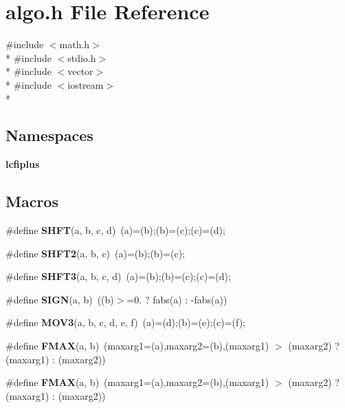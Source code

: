 \section{algo.\-h File Reference}
\label{algo_8h}
{\ttfamily \#include $<$math.\-h$>$}\\*
{\ttfamily \#include $<$stdio.\-h$>$}\\*
{\ttfamily \#include $<$vector$>$}\\*
{\ttfamily \#include $<$iostream$>$}\\*
\subsection*{Namespaces}
\begin{DoxyCompactItemize}
\item 
{\bf lcfiplus}
\end{DoxyCompactItemize}
\subsection*{Macros}
\begin{DoxyCompactItemize}
\item 
\#define {\bf S\-H\-F\-T}(a, b, c, d)~(a)=(b);(b)=(c);(c)=(d);
\item 
\#define {\bf S\-H\-F\-T2}(a, b, c)~(a)=(b);(b)=(c);
\item 
\#define {\bf S\-H\-F\-T3}(a, b, c, d)~(a)=(b);(b)=(c);(c)=(d);
\item 
\#define {\bf S\-I\-G\-N}(a, b)~((b)$>$=0. ? fabs(a) \-: -\/fabs(a))
\item 
\#define {\bf M\-O\-V3}(a, b, c, d, e, f)~(a)=(d);(b)=(e);(c)=(f);
\item 
\#define {\bf F\-M\-A\-X}(a, b)~(maxarg1=(a),maxarg2=(b),(maxarg1) $>$ (maxarg2) ? (maxarg1) \-: (maxarg2))
\item 
\#define {\bf F\-M\-A\-X}(a, b)~(maxarg1=(a),maxarg2=(b),(maxarg1) $>$ (maxarg2) ? (maxarg1) \-: (maxarg2))
\end{DoxyCompactItemize}
